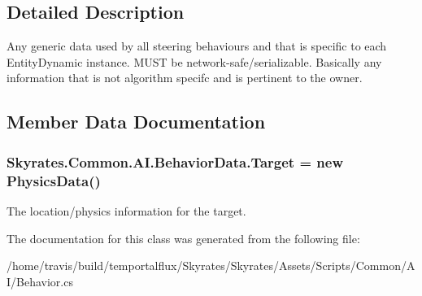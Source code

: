 \subsection{Detailed Description}
Any generic data used by all steering behaviours and that is specific to each Entity\-Dynamic instance. M\-U\-S\-T be network-\/safe/serializable. Basically any information that is not algorithm specifc and is pertinent to the owner. 



\subsection{Member Data Documentation}
\hypertarget{class_skyrates_1_1_common_1_1_a_i_1_1_behavior_data_a0016ce570450bebed638dfc26459490c}{
\subsubsection[{Target}]{ Skyrates.\-Common.\-A\-I.\-Behavior\-Data.\-Target = new {\bf Physics\-Data}()}}\label{class_skyrates_1_1_common_1_1_a_i_1_1_behavior_data_a0016ce570450bebed638dfc26459490c}


The location/physics information for the target. 



The documentation for this class was generated from the following file\-:\begin{DoxyCompactItemize}
\item 
/home/travis/build/temportalflux/\-Skyrates/\-Skyrates/\-Assets/\-Scripts/\-Common/\-A\-I/Behavior.\-cs\end{DoxyCompactItemize}
